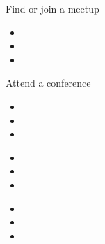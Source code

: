 \documentclass[xcolor={svgnames},hyperref]{beamer}
\begin{document}
    \begin{frame}
        Find or join a meetup
        \begin{itemize}
            \item
            \item
            \item
        \end{itemize}
    \end{frame}

    \begin{frame}
        Attend a conference
        \begin{itemize}
            \item
            \item
            \item
        \end{itemize}
    \end{frame}

    \begin{frame}
        \begin{itemize}
            \item
            \item
            \item
        \end{itemize}
    \end{frame}

    \begin{frame}
        \begin{itemize}
            \item
            \item
            \item
        \end{itemize}
    \end{frame}
\end{document}
